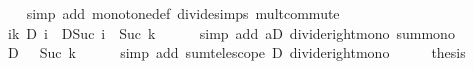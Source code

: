 \begin{isabellebody}
\ \ \ \ \isamarkupfalse%
\ {\isacharparenleft}{\kern0pt}simp\ add{\isacharcolon}{\kern0pt}\ monotone{\isacharunderscore}{\kern0pt}def\ divide{\isacharunderscore}{\kern0pt}simps\ mult{\isachardot}{\kern0pt}commute{\isacharparenright}{\kern0pt}\isanewline
\ \ \isamarkupfalse%
\ \isamarkupfalse%
\ {\isachardoublequoteopen}{\isasymdots}\ {\isasymle}\ {\isacharparenleft}{\kern0pt}{\isasymSum}i{\isasymle}k{\isachardot}{\kern0pt}\ D\ i\ {\isacharminus}{\kern0pt}\ D{\isacharparenleft}{\kern0pt}Suc\ i{\isacharparenright}{\kern0pt}{\isacharparenright}{\kern0pt}\ {\isacharslash}{\kern0pt}\ {\isacharparenleft}{\kern0pt}Suc\ k{\isacharparenright}{\kern0pt}{\isachardoublequoteclose}\isanewline
\ \ \ \ \isamarkupfalse%
\ {\isacharparenleft}{\kern0pt}simp\ add{\isacharcolon}{\kern0pt}\ aD\ divide{\isacharunderscore}{\kern0pt}right{\isacharunderscore}{\kern0pt}mono\ sum{\isacharunderscore}{\kern0pt}mono{\isacharparenright}{\kern0pt}\isanewline
\ \ \isamarkupfalse%
\ \isamarkupfalse%
\ {\isachardoublequoteopen}{\isasymdots}\ {\isasymle}\ D\ {}\ {\isacharslash}{\kern0pt}\ {\isacharparenleft}{\kern0pt}Suc\ k{\isacharparenright}{\kern0pt}{\isachardoublequoteclose}\isanewline
\ \ \ \ \isamarkupfalse%
\ {\isacharparenleft}{\kern0pt}simp\ add{\isacharcolon}{\kern0pt}\ sum{\isacharunderscore}{\kern0pt}telescope\ D\ divide{\isacharunderscore}{\kern0pt}right{\isacharunderscore}{\kern0pt}mono{\isacharparenright}{\kern0pt}\isanewline
\ \ \isamarkupfalse%
\ \isamarkupfalse%
\ {\isacharquery}{\kern0pt}thesis\ \isakeywordONE{{\isachardot}{\kern0pt}}\isamarkupfalse%
\isanewline
{}\isamarkupfalse%
%
\endisatagproof
{\isafoldproof}%
%
\isadelimproof
\isanewline
%
\endisadelimproof
%
\isadelimtheory
\isanewline
%
\endisadelimtheory
%
\isatagtheory
{}\isamarkupfalse%
%
\endisatagtheory
{\isafoldtheory}%
%
\isadelimtheory
%
\endisadelimtheory
%
\end{isabellebody}%
\endinput
